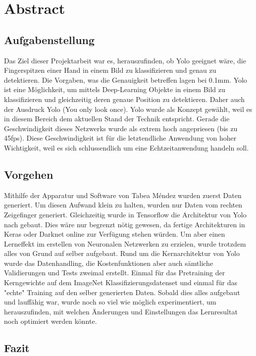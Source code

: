 \newpage
\section{Abstract}
\subsection{Aufgabenstellung}
Das Ziel dieser Projektarbeit war es, herauszufinden, ob Yolo geeignet wäre, die Fingerspitzen einer Hand in einem Bild zu klassifizieren und genau zu detektieren. 
Die Vorgaben, was die Genauigkeit betreffen lagen bei 0.1mm.
Yolo ist eine Möglichkeit, um mittels Deep-Learning Objekte in einem Bild zu klassifizieren und gleichzeitig deren genaue Position zu detektieren. 
Daher auch der Ausdruck Yolo (You only look once).
Yolo wurde als Konzept gewählt, weil es in diesem Bereich dem aktuellen Stand der Technik entspricht. 
Gerade die Geschwindigkeit dieses Netzwerks wurde als extrem hoch angepriesen (bis zu 45fps).
Diese Geschwindigkeit ist für die letztendliche Anwendung von hoher Wichtigkeit, weil es sich schlussendlich um eine Echtzeitanwendung handeln soll. 

\subsection{Vorgehen}
Mithilfe der Apparatur und Software von Tabea Méndez wurden zuerst Daten generiert. 
Um diesen Aufwand klein zu halten, wurden nur Daten vom rechten Zeigefinger generiert. 
Gleichzeitig wurde in Tensorflow die Architektur von Yolo nach gebaut. 
Dies wäre nur begrenzt nötig gewesen, da fertige Architekturen in Keras oder Darknet online zur Verfügung stehen würden. 
Um aber einen Lerneffekt im erstellen von Neuronalen Netzwerken zu erzielen, wurde trotzdem alles von Grund auf selber aufgebaut. 
Rund um die Kernarchitektur von Yolo wurde das Datenhandling, die Kostenfunktionen aber auch sämtliche Validierungen und Tests zweimal erstellt.  
Einmal für das Pretraining der Kerngewichte auf dem ImageNet Klassifizierungsdatenset und einmal für das "echte" Training auf den selber generierten Daten. 
Sobald dies alles aufgebaut und lauffähig war, wurde noch so viel wie möglich experimentiert, um herauszufinden, mit welchen Änderungen und Einstellungen das Lernresultat noch optimiert werden könnte.    

\subsection{Fazit}


